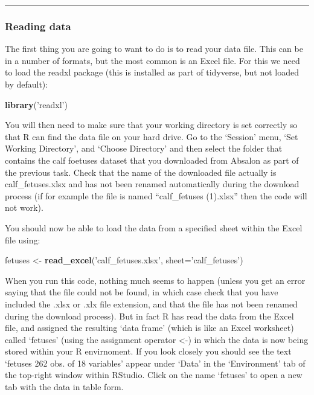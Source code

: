 \documentclass[
]{article}
\newenvironment{Shaded}{\begin{snugshade}}{\end{snugshade}}
\newcommand{\DataTypeTok}[1]{\textcolor[rgb]{0.13,0.29,0.53}{#1}}
\newcommand{\KeywordTok}[1]{\textcolor[rgb]{0.13,0.29,0.53}{\textbf{#1}}}
\newcommand{\NormalTok}[1]{#1}
\newcommand{\StringTok}[1]{\textcolor[rgb]{0.31,0.60,0.02}{#1}}
\begin{document}
\begin{center}\rule{0.5\linewidth}{0.5pt}\end{center}

\hypertarget{reading-data}{%
\subsubsection{Reading data}\label{reading-data}}

The first thing you are going to want to do is to read your data file.
This can be in a number of formats, but the most common is an Excel
file. For this we need to load the readxl package (this is installed as
part of tidyverse, but not loaded by default):

\begin{Shaded}
\begin{Highlighting}[]
\KeywordTok{library}\NormalTok{(}\StringTok{'readxl'}\NormalTok{)}
\end{Highlighting}
\end{Shaded}

You will then need to make sure that your working directory is set
correctly so that R can find the data file on your hard drive. Go to the
`Session' menu, `Set Working Directory', and `Choose Directory' and then
select the folder that contains the calf foetuses dataset that you
downloaded from Absalon as part of the previous task. Check that the
name of the downloaded file actually is calf\_fetuses.xlsx and has not
been renamed automatically during the download process (if for example
the file is named ``calf\_fetuses (1).xlsx'' then the code will not
work).

You should now be able to load the data from a specified sheet within
the Excel file using:

\begin{Shaded}
\begin{Highlighting}[]
\NormalTok{fetuses <-}\StringTok{ }\KeywordTok{read_excel}\NormalTok{(}\StringTok{'calf_fetuses.xlsx'}\NormalTok{, }\DataTypeTok{sheet=}\StringTok{'calf_fetuses'}\NormalTok{)}
\end{Highlighting}
\end{Shaded}

When you run this code, nothing much seems to happen (unless you get an
error saying that the file could not be found, in which case check that
you have included the .xlsx or .xlx file extension, and that the file
has not been renamed during the download process). But in fact R has
read the data from the Excel file, and assigned the resulting `data
frame' (which is like an Excel worksheet) called `fetuses' (using the
assignment operator \textless-) in which the data is now being stored
within your R envirnoment. If you look closely you should see the text
`fetuses 262 obs. of 18 variables' appear under `Data' in the
`Environment' tab of the top-right window within RStudio. Click on the
name `fetuses' to open a new tab with the data in table form.
\end{document}
